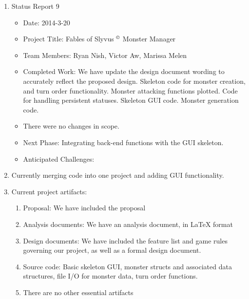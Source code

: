 \documentclass[letterpaper,12pt]{letter}
\begin{document}
\begin{enumerate}
\item Status Report 9
\begin{itemize}
\item Date: 2014-3-20
\item Project Title: Fables of Slyvus $^{\small \copyright}$ Monster Manager
\item Team Members: Ryan Nish, Victor Aw, Marissa Melen
\item Completed Work: We have update the design document wording to
  accurately reflect the proposed design.
  Skeleton code for monster creation, and turn order functionality.  
  Monster attacking functions plotted.
  Code for handling persistent statuses. 
  Skeleton GUI code. 
  Monster generation code.
\item There were no changes in scope.
\item Next Phase: Integrating back-end functions with the GUI skeleton.
\item Anticipated Challenges: 
\end{itemize}
\item Currently merging code into one project and adding GUI functionality.
\item Current project artifacts:
\begin{enumerate}
\item Proposal: We have included the proposal 
\item Analysis documents: We have an analysis document, in LaTeX format
\item Design documents: We have included the feature list and game
  rules governing our project, as well as a formal design document.
\item Source code: Basic skeleton GUI, monster structs and associated data structures, file I/O for monster data, turn order functions.
\item There are no other essential artifacts
\end{enumerate}
\end{enumerate}
\end{document}
